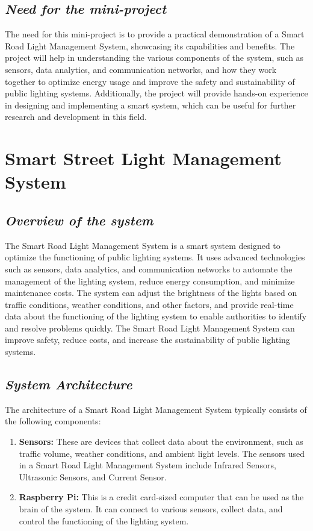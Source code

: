 \documentclass{article}
\begin{document}
\subsection{\textit{Need for the mini-project}}
The need for this mini-project is to provide a practical demonstration of a Smart Road Light Management System, showcasing its capabilities and benefits. The project will help in understanding the various components of the system, such as sensors, data analytics, and communication networks, and how they work together to optimize energy usage and improve the safety and sustainability of public lighting systems. Additionally, the project will provide hands-on experience in designing and implementing a smart system, which can be useful for further research and development in this field.
\section{\textbf{Smart Street Light Management System}}
\subsection{\textit{Overview of the system}}
The Smart Road Light Management System is a smart system designed to optimize the functioning of public lighting systems. It uses advanced technologies such as sensors, data analytics, and communication networks to automate the management of the lighting system, reduce energy consumption, and minimize maintenance costs. The system can adjust the brightness of the lights based on traffic conditions, weather conditions, and other factors, and provide real-time data about the functioning of the lighting system to enable authorities to identify and resolve problems quickly. The Smart Road Light Management System can improve safety, reduce costs, and increase the sustainability of public lighting systems.
\subsection{\textit{System Architecture}}
The architecture of a Smart Road Light Management System typically consists of the following components:
\begin{enumerate}
    \item \textbf{Sensors:} These are devices that collect data about the environment, such as traffic volume, weather conditions, and ambient light levels. The sensors used in a Smart Road Light Management System include Infrared Sensors, Ultrasonic Sensors, and Current Sensor.
    \item \textbf{Raspberry Pi:} This is a credit card-sized computer that can be used as the brain of the system. It can connect to various sensors, collect data, and control the functioning of the lighting system.
\end{enumerate}
\end{document}
